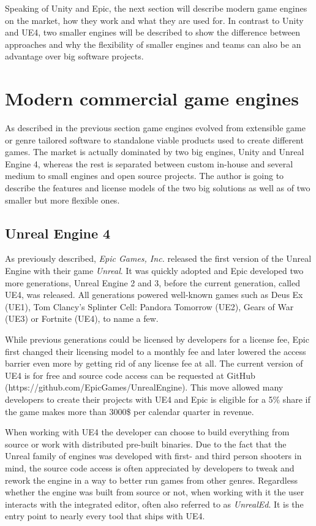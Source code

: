 Speaking of Unity and Epic, the next section will describe modern game engines on the market, how they work and what they are used for. In contrast to Unity and \acl{UE4}, two smaller engines will be described to show the difference between approaches and why the flexibility of smaller engines and teams can also be an advantage over big software projects.


\section{Modern commercial game engines}

As described in the previous section game engines evolved from extensible game or genre tailored software to standalone viable products used to create different games. The market is actually dominated by two big engines, Unity and Unreal Engine 4, whereas the rest is separated between custom in-house and several medium to small engines and open source projects. The author is going to describe the features and license models of the two big solutions as well as of two smaller but more flexible ones.

\subsection{Unreal Engine 4}

As previously described, \textit{Epic Games, Inc.} released the first version of the Unreal Engine with their game \textit{Unreal}. It was quickly adopted and Epic developed two more generations, Unreal Engine 2 and 3, before the current generation, called \ac{UE4}, was released. 
All generations powered well-known games such as Deus Ex (UE1), Tom Clancy’s Splinter Cell: Pandora Tomorrow (UE2), Gears of War (UE3) or Fortnite (UE4), to name a few.

While previous generations could be licensed by developers for a license fee, Epic first changed their licensing model to a monthly fee and later lowered the access barrier even more by getting rid of any license fee at all. The current version of \ac{UE4} is for free and source code access can be requested at GitHub (https://github.com/EpicGames/UnrealEngine). This move allowed many developers to create their projects with \ac{UE4} and Epic is eligible for a 5\% share if the game makes more than 3000\$ per calendar quarter in revenue.\cite{UE4_F}

When working with \ac{UE4} the developer can choose to build everything from source or work with distributed pre-built binaries. Due to the fact that the Unreal family of engines was developed with first- and third person shooters in mind, the source code access is often appreciated by developers to tweak and rework the engine in a way to better run games from other genres. Regardless whether the engine was built from source or not, when working with it the user interacts with the integrated editor, often also referred to as \textit{UnrealEd}. It is the entry point to nearly every tool that ships with \ac{UE4}.

